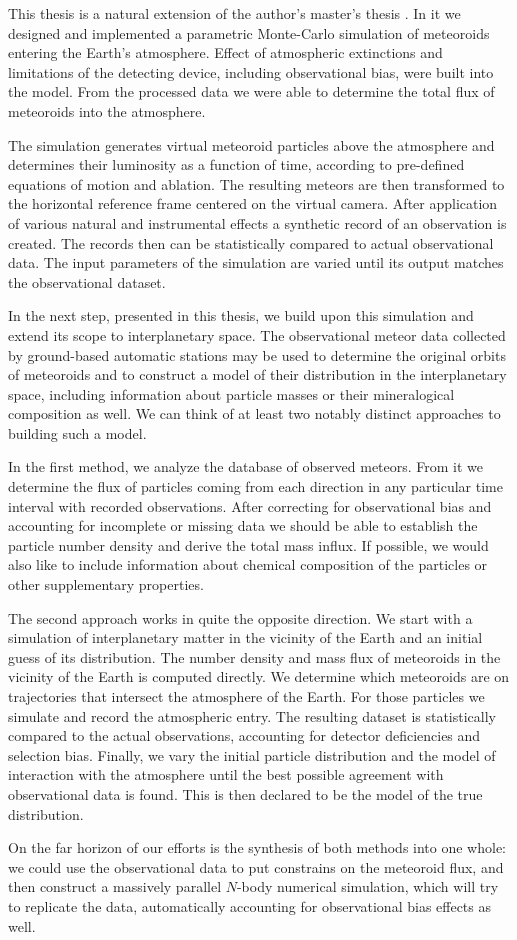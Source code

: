 This thesis is a natural extension of the author's master's thesis \citep{balaz-thesis}.
In it we designed and implemented a parametric Monte-Carlo simulation of meteoroids entering the Earth's atmosphere.
Effect of atmospheric extinctions and limitations of the detecting device, including observational bias, were built into the model.
From the processed data we were able to determine the total flux of meteoroids into the atmosphere.

The simulation generates virtual meteoroid particles above the atmosphere and determines their
luminosity as a function of time, according to pre-defined equations of motion and ablation.
The resulting meteors are then transformed to the horizontal reference frame centered on the virtual camera.
After application of various natural and instrumental effects a synthetic record of an observation is created.
The records then can be statistically compared to actual observational data.
The input parameters of the simulation are varied until its output matches the observational dataset.

In the next step, presented in this thesis, we build upon this simulation and extend its scope to interplanetary space.
The observational meteor data collected by ground-based automatic stations may be used
to determine the original orbits of meteoroids and to construct a model
of their distribution in the interplanetary space, including information
about particle masses or their mineralogical composition as well.
We can think of at least two notably distinct approaches to building such a model.

In the first method, we analyze the database of observed meteors. From it we determine
the flux of particles coming from each direction in any particular time interval with recorded observations.
After correcting for observational bias and accounting for incomplete or missing
data we should be able to establish the particle number density and derive the total mass influx.
If possible, we would also like to include information
about chemical composition of the particles or other supplementary properties.

The second approach works in quite the opposite direction. We start with a simulation
of interplanetary matter in the vicinity of the Earth and an initial guess of its distribution.
The number density and mass flux of meteoroids in the vicinity of the Earth is computed directly.
We determine which meteoroids are on trajectories that intersect the atmosphere of the Earth.
For those particles we simulate and record the atmospheric entry. The resulting dataset is statistically compared
to the actual observations, accounting for detector deficiencies and selection bias.
Finally, we vary the initial particle distribution and the model of interaction with the atmosphere
until the best possible agreement with observational data is found.
This is then declared to be the model of the true distribution.

On the far horizon of our efforts is the synthesis of both methods into one whole:
we could use the observational data to put constrains on the meteoroid flux,
and then construct a massively parallel $N$-body numerical simulation,
which will try to replicate the data, automatically accounting for observational bias effects as well.
